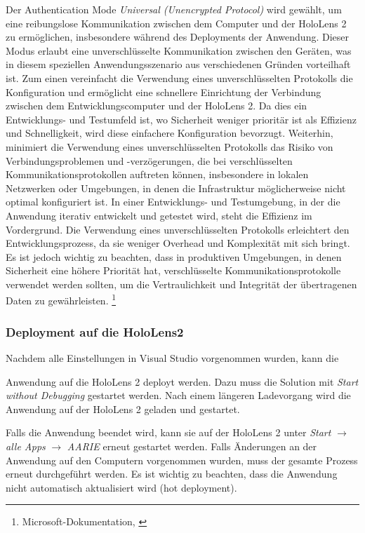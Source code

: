 Der Authentication Mode \textit{Universal (Unencrypted Protocol)} wird gewählt, um eine reibungslose Kommunikation zwischen dem Computer und der HoloLens 2 zu ermöglichen, insbesondere während des Deployments der Anwendung. Dieser Modus erlaubt eine unverschlüsselte Kommunikation zwischen den Geräten, was in diesem speziellen Anwendungsszenario aus verschiedenen Gründen vorteilhaft ist. Zum einen vereinfacht die Verwendung eines unverschlüsselten Protokolls die Konfiguration und ermöglicht eine schnellere Einrichtung der Verbindung zwischen dem Entwicklungscomputer und der HoloLens 2. Da dies ein Entwicklungs- und Testumfeld ist, wo Sicherheit weniger prioritär ist als Effizienz und Schnelligkeit, wird diese einfachere Konfiguration bevorzugt. Weiterhin, minimiert die Verwendung eines unverschlüsselten Protokolls das Risiko von Verbindungsproblemen und -verzögerungen, die bei verschlüsselten Kommunikationsprotokollen auftreten können, insbesondere in lokalen Netzwerken oder Umgebungen, in denen die Infrastruktur möglicherweise nicht optimal konfiguriert ist. In einer Entwicklungs- und Testumgebung, in der die Anwendung iterativ entwickelt und getestet wird, steht die Effizienz im Vordergrund. Die Verwendung eines unverschlüsselten Protokolls erleichtert den Entwicklungsprozess, da sie weniger Overhead und Komplexität mit sich bringt. Es ist jedoch wichtig zu beachten, dass in produktiven Umgebungen, in denen Sicherheit eine höhere Priorität hat, verschlüsselte Kommunikationsprotokolle verwendet werden sollten, um die Vertraulichkeit und Integrität der übertragenen Daten zu gewährleisten. \footnote{Microsoft-Dokumentation, \cite{Universal Unencrypted Protocol}}


\subsubsection*{Deployment auf die HoloLens2}
Nachdem alle Einstellungen in Visual Studio vorgenommen wurden, kann die

Anwendung auf die HoloLens 2 deployt werden. Dazu muss die Solution mit \textit{Start without Debugging} gestartet werden. Nach einem längeren Ladevorgang wird die Anwendung auf der HoloLens 2 geladen und gestartet.

Falls die Anwendung beendet wird, kann sie auf der HoloLens 2 unter \textit{Start} $\rightarrow$ \textit{alle Apps} $\rightarrow$ \textit{AARIE} erneut gestartet werden. Falls Änderungen an der Anwendung auf den Computern vorgenommen wurden, muss der gesamte Prozess erneut durchgeführt werden. Es ist wichtig zu beachten, dass die Anwendung nicht automatisch aktualisiert wird (hot deployment).

